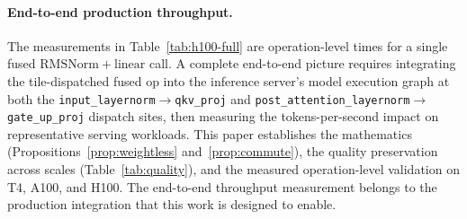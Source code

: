 \documentclass{article}
\begin{document}
\paragraph{End-to-end production throughput.} The measurements in Table~\ref{tab:h100-full} are operation-level times for a single fused $\mathrm{RMSNorm}+\mathrm{linear}$ call. A complete end-to-end picture requires integrating the tile-dispatched fused op into the inference server's model execution graph at both the \texttt{input\_layernorm}$\to$\texttt{qkv\_proj} and \texttt{post\_attention\_layernorm}$\to$\texttt{gate\_up\_proj} dispatch sites, then measuring the tokens-per-second impact on representative serving workloads. This paper establishes the mathematics (Propositions~\ref{prop:weightless} and~\ref{prop:commute}), the quality preservation across scales (Table~\ref{tab:quality}), and the measured operation-level validation on T4, A100, and H100. The end-to-end throughput measurement belongs to the production integration that this work is designed to enable.

\newpage

\end{document}
